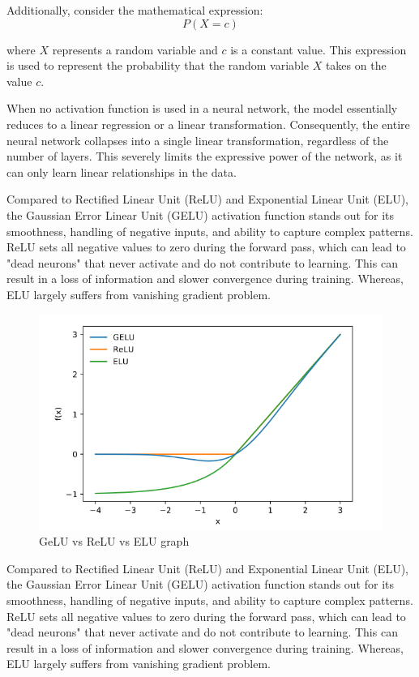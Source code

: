 \noindent Additionally, consider the mathematical expression:
\begin{equation}
    P(X = c) \label{eq:probability}
\end{equation}

\noindent where $X$ represents a random variable and $c$ is a constant value. This expression is used to represent the probability that the random variable $X$ takes on the value $c$.

\noindent When no activation function is used in a neural network, the model essentially reduces to a linear regression or a linear transformation. Consequently, the entire neural network collapses into a single linear transformation, regardless of the number of layers. This severely limits the expressive power of the network, as it can only learn linear relationships in the data.

\noindent Compared to Rectified Linear Unit (ReLU) and Exponential Linear Unit (ELU), the Gaussian Error Linear Unit (GELU) activation function stands out for its smoothness, handling of negative inputs, and ability to capture complex patterns. ReLU sets all negative values to zero during the forward pass, which can lead to "dead neurons" that never activate and do not contribute to learning. This can result in a loss of information and slower convergence during training. Whereas, ELU largely suffers from vanishing gradient problem.

\begin{figure}[htbp]
    \centering
    \includegraphics[width=6in]{img/gelu vs relu.png}
    \caption{{GeLU vs ReLU vs ELU graph}}
\end{figure}

\noindent Compared to Rectified Linear Unit (ReLU) and Exponential Linear Unit (ELU), the Gaussian Error Linear Unit (GELU) activation function stands out for its smoothness, handling of negative inputs, and ability to capture complex patterns. ReLU sets all negative values to zero during the forward pass, which can lead to "dead neurons" that never activate and do not contribute to learning. This can result in a loss of information and slower convergence during training. Whereas, ELU largely suffers from vanishing gradient problem.

